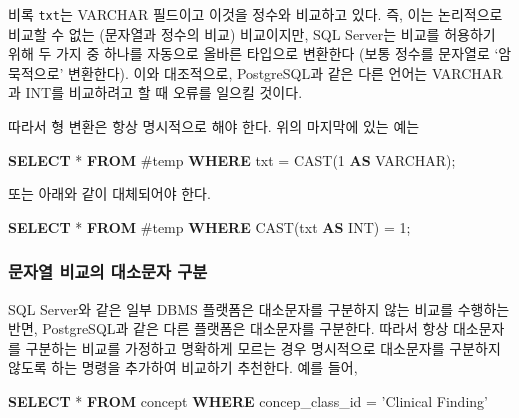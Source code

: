 \documentclass[10.5pt]{book}
\newenvironment{Shaded}{\begin{snugshade}}{\end{snugshade}}
\newcommand{\KeywordTok}[1]{\textcolor[rgb]{0.13,0.29,0.53}{\textbf{#1}}}
\newcommand{\DataTypeTok}[1]{\textcolor[rgb]{0.13,0.29,0.53}{#1}}
\newcommand{\DecValTok}[1]{\textcolor[rgb]{0.00,0.00,0.81}{#1}}
\newcommand{\StringTok}[1]{\textcolor[rgb]{0.31,0.60,0.02}{#1}}
\newcommand{\FunctionTok}[1]{\textcolor[rgb]{0.00,0.00,0.00}{#1}}
\newcommand{\NormalTok}[1]{#1}
\theoremstyle{definition}
\theoremstyle{definition}
\theoremstyle{definition}
\theoremstyle{remark}
\begin{document}
비록 \texttt{txt}는 VARCHAR 필드이고 이것을 정수와 비교하고 있다. 즉,
이는 논리적으로 비교할 수 없는 (문자열과 정수의 비교) 비교이지만, SQL
Server는 비교를 허용하기 위해 두 가지 중 하나를 자동으로 올바른 타입으로
변환한다 (보통 정수를 문자열로 `암묵적으로' 변환한다). 이와 대조적으로,
PostgreSQL과 같은 다른 언어는 VARCHAR과 INT를 비교하려고 할 때 오류를
일으킬 것이다.

따라서 형 변환은 항상 명시적으로 해야 한다. 위의 마지막에 있는 예는

\begin{Shaded}
\begin{Highlighting}[]
\KeywordTok{SELECT}\NormalTok{ * }\KeywordTok{FROM}\NormalTok{ #temp }\KeywordTok{WHERE}\NormalTok{ txt = }\FunctionTok{CAST}\NormalTok{(}\DecValTok{1} \KeywordTok{AS} \DataTypeTok{VARCHAR}\NormalTok{);}
\end{Highlighting}
\end{Shaded}

또는 아래와 같이 대체되어야 한다.

\begin{Shaded}
\begin{Highlighting}[]
\KeywordTok{SELECT}\NormalTok{ * }\KeywordTok{FROM}\NormalTok{ #temp }\KeywordTok{WHERE} \FunctionTok{CAST}\NormalTok{(txt }\KeywordTok{AS} \DataTypeTok{INT}\NormalTok{) = }\DecValTok{1}\NormalTok{;}
\end{Highlighting}
\end{Shaded}

\subsubsection*{문자열 비교의 대소문자 구분}\label{---}

SQL Server와 같은 일부 DBMS 플랫폼은 대소문자를 구분하지 않는 비교를
수행하는 반면, PostgreSQL과 같은 다른 플랫폼은 대소문자를 구분한다.
따라서 항상 대소문자를 구분하는 비교를 가정하고 명확하게 모르는 경우
명시적으로 대소문자를 구분하지 않도록 하는 명령을 추가하여 비교하기
추천한다. 예를 들어,

\begin{Shaded}
\begin{Highlighting}[]
\KeywordTok{SELECT}\NormalTok{ * }\KeywordTok{FROM}\NormalTok{ concept }\KeywordTok{WHERE}\NormalTok{ concep_class_id = }\StringTok{'Clinical Finding'}
\end{Highlighting}
\end{Shaded}
\end{document}
